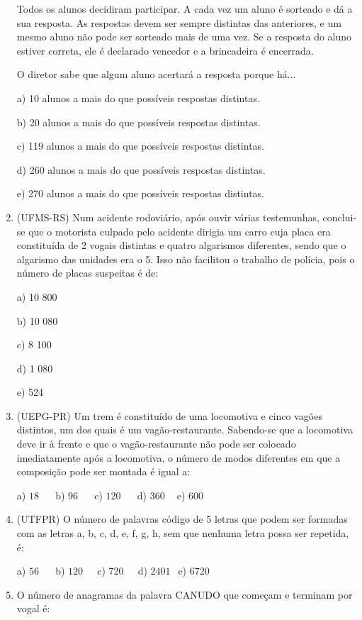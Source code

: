 \begin{multicols*}{2}
\begin{enumerate}
	Todos os alunos decidiram participar. A cada vez um aluno é sorteado e dá a sua resposta. As respostas devem ser sempre distintas das anteriores, e um mesmo aluno não pode ser sorteado mais de uma vez. Se a resposta do aluno estiver correta, ele é declarado vencedor e a brincadeira é encerrada.
	
O diretor sabe que algum aluno acertará a resposta porque há...

a) 10 alunos a mais do que possíveis respostas distintas.

b) 20 alunos a mais do que possíveis respostas distintas.

c) 119 alunos a mais do que possíveis respostas distintas.

d) 260 alunos a mais do que possíveis respostas distintas.

e) 270 alunos a mais do que possíveis respostas distintas.

	\item (UFMS-RS) Num acidente rodoviário, após ouvir várias testemunhas, conclui-se que o motorista culpado pelo acidente dirigia um carro cuja placa era constituída de 2 vogais distintas e quatro algarismos diferentes, sendo que o algarismo das unidades era o 5. Isso não facilitou o trabalho de polícia, pois o número de placas suspeitas é de: 
	
a) 10 800 

b) 10 080 

c) 8 100 

d) 1 080 

e) 524

	\item (UEPG-PR) Um trem é constituído de uma locomotiva e cinco vagões distintos, um dos quais é um vagão-restaurante. Sabendo-se que a locomotiva deve ir à frente e que o vagão-restaurante não pode ser colocado imediatamente após a locomotiva, o número de modos diferentes em que a composição pode ser montada é igual a: 

	a) $18 \ \ \ \ \ \ $ b) $96 \ \ \ \ \ \ $ c) $120 \ \ \ \ \ \ $ d) $360 \ \ \ \ $ e) $600 \ \ $

	\item (UTFPR) O número de palavras código de 5 letras que podem ser formadas com as letras a, b, c, d, e, f, g, h, sem que nenhuma letra possa ser repetida, é: 
	
	a) $56 \ \ \ \ \ \ $ b) $120 \ \ \ \ \ $ c) $720 \ \ \ \ \ $ d) $2401 \ \ $ e) $6720 $

	\item O número de anagramas da palavra CANUDO que começam e terminam por vogal é: 


\end{enumerate}
\end{multicols*}
